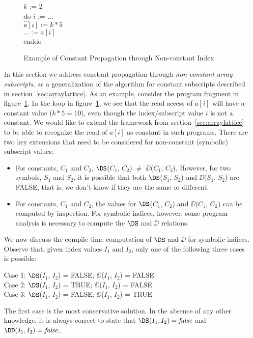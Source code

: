 \begin{figure}
\begin{center}
\parbox{3.0in}{
\begin{programa}
\Ta $k$ := 2 \\
\Ta do $i$ := $\ldots$ \\
\Tb  $\ldots$ \\
\Tb  $a[i] := k * 5$ \\
\Tb  $\ldots := a[i]$ \\
\Ta enddo \\
\end{programa}
}
\end{center}
\caption{Example of Constant Propagation through Non-constant Index}
\label{fig:non-const-ex-source}
\end{figure}

In this section we address constant propagation
through {\it non-constant array subscripts}, as a generalization
of the algorithm
for constant subscripts described in section~\ref{sec:arraylattice}.
As an example, consider the program fragment in
figure~\ref{fig:non-const-ex-source}.  In the loop in
figure~\ref{fig:non-const-ex-source}, we see that the read access of
$a[i]$ will have a constant value ($k*5=10$), even though the
index/subscript value $i$ is not a constant.  We would like to extend
the framework from section~\ref{sec:arraylattice}  to be
able to recognize the read of $a[i]$ as constant in such programs.
There are two key extensions that need to be considered
for non-constant (symbolic) subscript values:
\begin{itemize}

\item  For constants, $C_1$ and $C_2$, $\DS$($C_1$, $C_2$) $\neq$ 
$\DD$($C_1$, $C_2$). However, for two symbols,  $S_1$ and $S_2$,
it is possible that both $\DS$($S_1$, $S_2$) and $\DD$($S_1$,
$S_2$) are FALSE, that is, we don't know if they are the same or different.

\item For constants, $C_1$ and $C_2$, the values for $\DS$($C_1$, $C_2$) and 
$\DD$($C_1$, $C_2$) can be computed by inspection. For symbolic
indices, however, some program analysis is necessary
to compute the $\DS$ and $\DD$ relations.
\end{itemize} 

We now discuss the compile-time
computation of $\DS$ and $\DD$ for symbolic
indices. 
Observe that,
given index values $I_1$ and $I_2$, only one of the following three cases
is possible:
\begin{center}
\parbox{3.0in}{
\begin{programa}
Case 1:   $\DS$($I_1$, $I_2$) = FALSE; $\DD$($I_1$, $I_2$) = FALSE \\
Case 2:   $\DS$($I_1$, $I_2$) = TRUE; $\DD$($I_1$, $I_2$) = FALSE \\
Case 3:   $\DS$($I_1$, $I_2$) = FALSE; $\DD$($I_1$, $I_2$) = TRUE \\
\end{programa}
}
\end{center}
The first case is the most conservative solution.  In the absence of
any other knowledge, it is always correct to state that
$\DS(I_1,I_2) = \mbox{\it false}$ and $\DD(I_1,I_2) = \mbox{\it
false}$.

